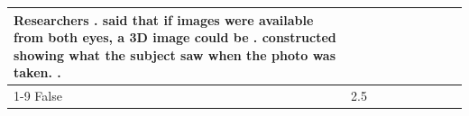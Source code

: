 \begin{table}[H]
\begin{tabular}{lllrlllll}
Researchers . said that if images were available from both eyes, a 3D image could be . constructed showing what the subject saw when the photo was taken. . \\
\cline{1-9}
False & 2.5%
\end{tabular}
\end{table}
